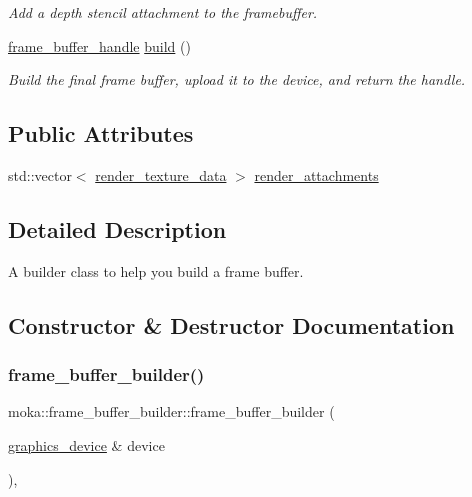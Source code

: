 \begin{DoxyCompactItemize}
\begin{DoxyCompactList}\small\item\em Add a depth stencil attachment to the framebuffer. \end{DoxyCompactList}\item 
\mbox{\hyperlink{structmoka_1_1frame__buffer__handle}{frame\+\_\+buffer\+\_\+handle}} \mbox{\hyperlink{structmoka_1_1frame__buffer__builder_a4923409d41757735101a7dd636286693}{build}} ()
\begin{DoxyCompactList}\small\item\em Build the final frame buffer, upload it to the device, and return the handle. \end{DoxyCompactList}\end{DoxyCompactItemize}
\subsection*{Public Attributes}
\begin{DoxyCompactItemize}
\item 
std\+::vector$<$ \mbox{\hyperlink{structmoka_1_1render__texture__data}{render\+\_\+texture\+\_\+data}} $>$ \mbox{\hyperlink{structmoka_1_1frame__buffer__builder_a5494dab8e049d0a05c5e434f919dbbd6}{render\+\_\+attachments}}
\end{DoxyCompactItemize}


\subsection{Detailed Description}
A builder class to help you build a frame buffer. 

\subsection{Constructor \& Destructor Documentation}
\mbox{\label{structmoka_1_1frame__buffer__builder_ae89d036ae7b2e0b0961069ae320b9657}} 
\subsubsection{\texorpdfstring{frame\_buffer\_builder()}{frame\_buffer\_builder()}\hspace{0.1cm}{\footnotesize\ttfamily [1/2]}}
{\footnotesize\ttfamily moka\+::frame\+\_\+buffer\+\_\+builder\+::frame\+\_\+buffer\+\_\+builder (\begin{DoxyParamCaption}\item[{\mbox{\hyperlink{classmoka_1_1graphics__device}{graphics\+\_\+device}} \&}]{device }\end{DoxyParamCaption})\hspace{0.3cm}{\ttfamily [inline]}, {\ttfamily [explicit]}}

